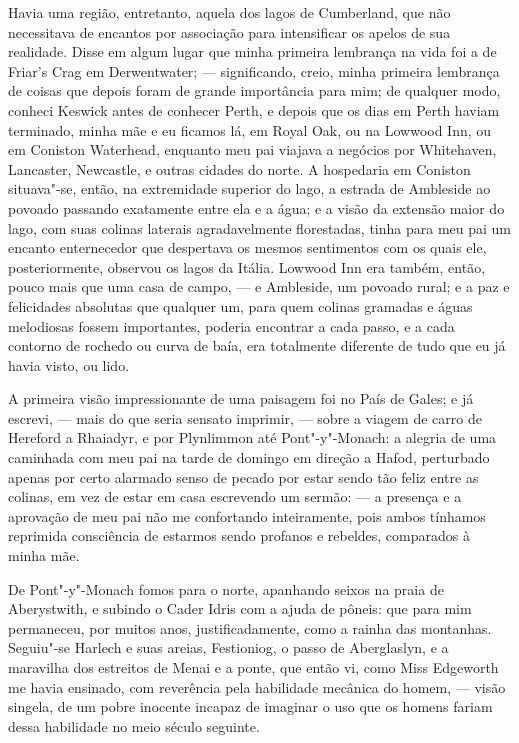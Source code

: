 Havia uma região, entretanto, aquela dos lagos de Cumberland, que
não necessitava de encantos por associação para intensificar os apelos
de sua realidade. Disse em algum lugar que minha primeira lembrança na
vida foi a de Friar's Crag em Derwentwater; --- significando, creio,
minha primeira lembrança de coisas que depois foram de grande
importância para mim; de qualquer modo, conheci Keswick antes de
conhecer Perth, e depois que os dias em Perth haviam terminado, minha
mãe e eu ficamos lá, em Royal Oak, ou na Lowwood Inn, ou em Coniston
Waterhead, enquanto meu pai viajava a negócios por Whitehaven,
Lancaster, Newcastle, e outras cidades do norte. A hospedaria em
Coniston situava"-se, então, na extremidade superior do lago, a estrada
de Ambleside ao povoado passando exatamente entre ela e a água; e a
visão da extensão maior do lago, com suas colinas laterais
agradavelmente florestadas, tinha para meu pai um encanto enternecedor
que despertava os mesmos sentimentos com os quais ele, posteriormente,
observou os lagos da Itália. Lowwood Inn era também, então, pouco mais
que uma casa de campo, --- e Ambleside, um povoado rural; e a paz e
felicidades absolutas que qualquer um, para quem colinas gramadas e
águas melodiosas fossem importantes, poderia encontrar a cada passo, e a
cada contorno de rochedo ou curva de baía, era totalmente diferente de
tudo que eu já havia visto, ou lido.

A primeira visão impressionante de uma paisagem foi no País de
Gales; e já escrevi, --- mais do que seria sensato imprimir, --- sobre a
viagem de carro de Hereford a Rhaiadyr, e por Plynlimmon até
Pont"-y"-Monach: a alegria de uma caminhada com meu pai na tarde de
domingo em direção a Hafod, perturbado apenas por certo alarmado senso
de pecado por estar sendo tão feliz entre as colinas, em vez de estar em
casa escrevendo um sermão: --- a presença e a aprovação de meu pai não me
confortando inteiramente, pois ambos tínhamos reprimida consciência de
estarmos sendo profanos e rebeldes, comparados à minha mãe.

De Pont"-y"-Monach fomos para o norte, apanhando seixos na praia de
Aberystwith, e subindo o Cader Idris com a ajuda de pôneis: que para mim
permaneceu, por muitos anos, justificadamente, como a rainha das
montanhas. Seguiu"-se Harlech e suas areias, Festioniog, o passo de
Aberglaslyn, e a maravilha dos estreitos de Menai e a ponte, que então
vi, como Miss Edgeworth me havia ensinado, com reverência pela
habilidade mecânica do homem, --- visão singela, de um pobre inocente
incapaz de imaginar o uso que os homens fariam dessa habilidade no meio
século seguinte.

